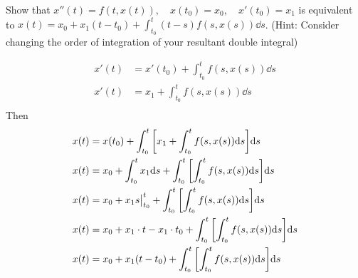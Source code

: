 Show that $x''(t) = f(t,x(t)), \quad x(t_0) = x_0, \quad x'(t_0) = x_1$ is equivalent to $x(t) = x_0 + x_1(t-t_0) + \int_{t_0}^t (t-s)f(s, x(s)) \dd s$. (Hint: Consider changing the order of integration of your resultant double integral)

\begin{align*}
  x'(t) &= x'(t_0) + \int_{t_0}^t f(s, x(s)) \dd s\\
  x'(t) &= x_1 + \int_{t_0}^t f(s, x(s)) \dd s\\
\end{align*}
Then
\begin{align*}
  x(t) &= x(t_0) + \int_{t_0}^t \bigg[ { x_1 + \int_{t_0}^t f(s, x(s)) \dd s } \bigg] \dd s\\
  x(t) &= x_0 + \int_{t_0}^t x_1 \dd s + \int_{t_0}^t \bigg[ { \int_{t_0}^t f(s, x(s)) \dd s } \bigg] \dd s\\
  x(t) &= x_0 + x_1 s \big|_{t_0}^{t} + \int_{t_0}^t \bigg[ { \int_{t_0}^t f(s, x(s)) \dd s } \bigg] \dd s\\
  x(t) &= x_0 + x_1 \cdot t - x_1 \cdot t_0 + \int_{t_0}^t \bigg[ { \int_{t_0}^t f(s, x(s)) \dd s } \bigg] \dd s\\
  x(t) &= x_0 + x_1(t-t_0) + \int_{t_0}^t \bigg[ { \int_{t_0}^t f(s, x(s)) \dd s } \bigg] \dd s\\
\end{align*}